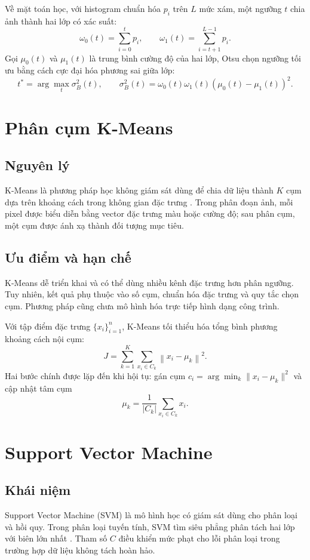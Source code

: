 \documentclass[12pt,a4paper]{report}
\begin{document}
Về mặt toán học, với histogram chuẩn hóa $p_i$ trên $L$ mức xám, một ngưỡng $t$ chia ảnh thành hai lớp có xác suất:
\[
\omega_0(t)=\sum_{i=0}^{t}p_i,\qquad
\omega_1(t)=\sum_{i=t+1}^{L-1}p_i.
\]
Gọi $\mu_0(t)$ và $\mu_1(t)$ là trung bình cường độ của hai lớp, Otsu chọn ngưỡng tối ưu bằng cách cực đại hóa phương sai giữa lớp:
\[
t^{*}=\arg\max_t \sigma_B^2(t),\qquad
\sigma_B^2(t)=\omega_0(t)\omega_1(t)\left(\mu_0(t)-\mu_1(t)\right)^2.
\]

\section{Phân cụm K-Means}

\subsection{Nguyên lý}

K-Means là phương pháp học không giám sát dùng để chia dữ liệu thành $K$ cụm dựa trên khoảng cách trong không gian đặc trưng \cite{macqueen1967methods}. Trong phân đoạn ảnh, mỗi pixel được biểu diễn bằng vector đặc trưng màu hoặc cường độ; sau phân cụm, một cụm được ánh xạ thành đối tượng mục tiêu.

\subsection{Ưu điểm và hạn chế}

K-Means dễ triển khai và có thể dùng nhiều kênh đặc trưng hơn phân ngưỡng. Tuy nhiên, kết quả phụ thuộc vào số cụm, chuẩn hóa đặc trưng và quy tắc chọn cụm. Phương pháp cũng chưa mô hình hóa trực tiếp hình dạng công trình.

Với tập điểm đặc trưng $\{x_i\}_{i=1}^{n}$, K-Means tối thiểu hóa tổng bình phương khoảng cách nội cụm:
\[
J=\sum_{k=1}^{K}\sum_{x_i\in C_k}\left\|x_i-\mu_k\right\|^2.
\]
Hai bước chính được lặp đến khi hội tụ: gán cụm $c_i=\arg\min_k \|x_i-\mu_k\|^2$ và cập nhật tâm cụm
\[
\mu_k=\frac{1}{|C_k|}\sum_{x_i\in C_k}x_i.
\]

\section{Support Vector Machine}

\subsection{Khái niệm}

Support Vector Machine (SVM) là mô hình học có giám sát dùng cho phân loại và hồi quy. Trong phân loại tuyến tính, SVM tìm siêu phẳng phân tách hai lớp với biên lớn nhất \cite{cortes1995support}. Tham số $C$ điều khiển mức phạt cho lỗi phân loại trong trường hợp dữ liệu không tách hoàn hảo.
\end{document}

